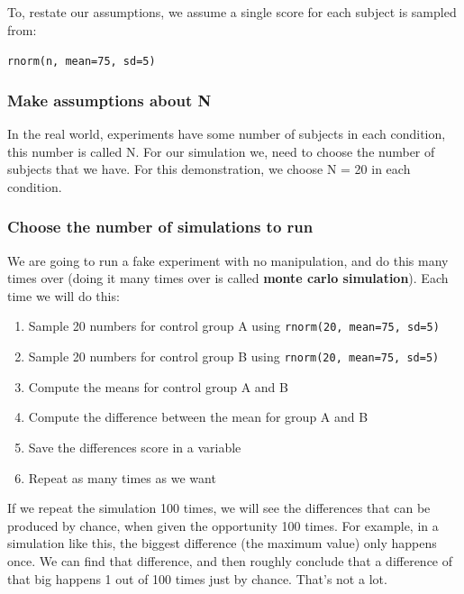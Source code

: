 \documentclass[
]{book}
\providecommand{\tightlist}{%
  \setlength{\itemsep}{0pt}\setlength{\parskip}{0pt}}
\begin{document}
To, restate our assumptions, we assume a single score for each subject is sampled from:

\texttt{rnorm(n,\ mean=75,\ sd=5)}

\hypertarget{make-assumptions-about-n}{%
\subsubsection{Make assumptions about N}\label{make-assumptions-about-n}}

In the real world, experiments have some number of subjects in each condition, this number is called N. For our simulation we, need to choose the number of subjects that we have. For this demonstration, we choose N = 20 in each condition.

\hypertarget{choose-the-number-of-simulations-to-run}{%
\subsubsection{Choose the number of simulations to run}\label{choose-the-number-of-simulations-to-run}}

We are going to run a fake experiment with no manipulation, and do this many times over (doing it many times over is called \textbf{monte carlo simulation}). Each time we will do this:

\begin{enumerate}
\def\labelenumi{\arabic{enumi}.}
\tightlist
\item
  Sample 20 numbers for control group A using \texttt{rnorm(20,\ mean=75,\ sd=5)}
\item
  Sample 20 numbers for control group B using \texttt{rnorm(20,\ mean=75,\ sd=5)}
\item
  Compute the means for control group A and B
\item
  Compute the difference between the mean for group A and B
\item
  Save the differences score in a variable
\item
  Repeat as many times as we want
\end{enumerate}

If we repeat the simulation 100 times, we will see the differences that can be produced by chance, when given the opportunity 100 times. For example, in a simulation like this, the biggest difference (the maximum value) only happens once. We can find that difference, and then roughly conclude that a difference of that big happens 1 out of 100 times just by chance. That's not a lot.
\end{document}
